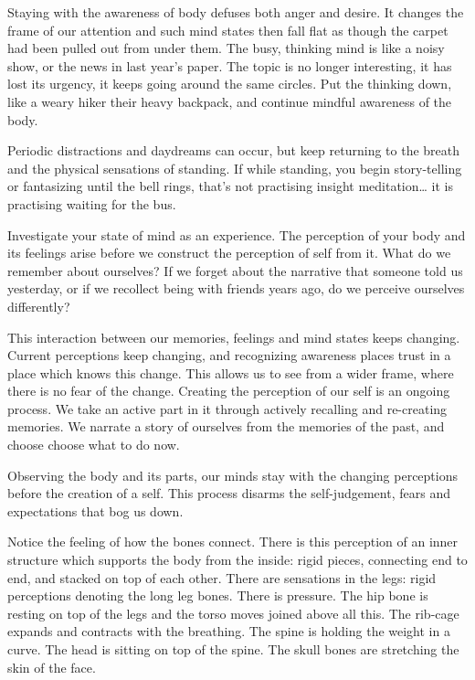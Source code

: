 Staying with the awareness of body defuses both anger and desire. It
changes the frame of our attention and such mind states then fall flat
as though the carpet had been pulled out from under them. The busy,
thinking mind is like a noisy show, or the news in last year's paper.
The topic is no longer interesting, it has lost its urgency, it keeps
going around the same circles. Put the thinking down, like a weary hiker
their heavy backpack, and continue mindful awareness of the body.

Periodic distractions and daydreams can occur, but keep returning to the
breath and the physical sensations of standing. If while standing, you
begin story-telling or fantasizing until the bell rings, that's not
practising insight meditation\ldots{} it is practising waiting for the
bus.


Investigate your state of mind as an experience. The perception of your
body and its feelings arise before we construct the perception of self
from it. What do we remember about ourselves? If we forget about the
narrative that someone told us yesterday, or if we recollect being with
friends years ago, do we perceive ourselves differently?

This interaction between our memories, feelings and mind states keeps
changing. Current perceptions keep changing, and recognizing awareness
places trust in a place which knows this change. This allows us to see
from a wider frame, where there is no fear of the change. Creating the
perception of our self is an ongoing process. We take an active part in
it through actively recalling and re-creating memories. We narrate a
story of ourselves from the memories of the past, and choose choose what
to do now.


Observing the body and its parts, our minds stay with the changing
perceptions before the creation of a self. This process disarms the
self-judgement, fears and expectations that bog us down.

Notice the feeling of how the bones connect. There is this perception of
an inner structure which supports the body from the inside: rigid
pieces, connecting end to end, and stacked on top of each other. There
are sensations in the legs: rigid perceptions denoting the long leg
bones. There is pressure. The hip bone is resting on top of the legs and
the torso moves joined above all this. The rib-cage expands and
contracts with the breathing. The spine is holding the weight in a
curve. The head is sitting on top of the spine. The skull bones are
stretching the skin of the face.

